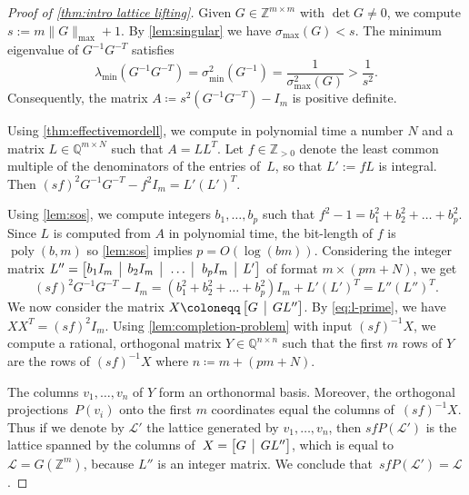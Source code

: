 \documentclass[a4paper,USenglish,cleveref,numberwithinsect]{lipics-v2021}
\DeclareMathOperator{\poly}{poly}
\newcommand{\QQ}{\mathbb{Q}}
\newcommand{\ZZ}{\mathbb{Z}}
\numberwithin{equation}{section}
\begin{document}
\begin{proof}[Proof of \cref{thm:intro lattice lifting}]
Given $G\in\ZZ^{m\times m}$ with $\det G\neq 0$, we compute
$s := m \|G\|_{\max} + 1 $.
By \cref{lem:singular} we have $\sigma_{\max}(G)< s$.
The minimum eigenvalue of $G^{-1}G^{-T}$ satisfies
\[
\lambda_{\min}(G^{-1}G^{-T}) = \sigma^2_{\min}(G^{-1}) = \frac{1}{\sigma^2_{\max}(G)} > \frac{1}{s^2}.
\]
Consequently, the matrix $A\coloneqq s^2 (G^{-1}G^{-T})-I_m$ is positive definite.

Using \cref{thm:effectivemordell}, we compute in polynomial time a number $N$
and a matrix $L\in\QQ^{m\times N}$ such that $A=LL^T$.
Let $f\in\ZZ_{>0}$ denote the least common multiple of the denominators of the entries of~$L$,
so that $L':=fL$ is integral. Then
$(sf)^2 G^{-1}G^{-T} - f^2 I_m= L'  (L')^T$.

Using \cref{lem:sos}, we compute integers $b_1,\ldots,b_p$ such that $f^2-1=b_1^2+b_2^2+\dots+b_p^2$.
Since $L$ is computed from $A$ in polynomial time, the bit-length of $f$ is $\poly(b,m)$ so \cref{lem:sos} implies $p=O(\log(bm))$.
Considering the integer matrix
$L'' = \begin{bmatrix}
		b_1 I_m \;\;\vline\;\; b_2 I_m \;\;\vline\;\; \dots  \;\;\vline\;\; b_p I_m  \;\;\vline\;\; L'
	\end{bmatrix}$
 of format $m\times (pm+N)$, we get
\begin{equation}\label{eq:l-prime}
 (sf)^2 G^{-1}G^{-T}  - I_m = (b_1^2+b_2^2+\dots+b_p^2)I_m+ L'  (L')^T = L'' (L'')^T.
\end{equation} %
We now consider the matrix $X\coloneqq \begin{bmatrix}
		G  \;\;\vline\;\; GL''
\end{bmatrix}$.
By \cref{eq:l-prime}, we have $XX^T = (sf)^2 I_m$.
Using \cref{lem:completion-problem} with input $(sf)^{-1} X$,
we compute a rational, orthogonal matrix $Y\in\QQ^{n\times n}$
such that the first $m$ rows of $Y$ are the rows of $(sf)^{-1} X$ where $n\coloneqq m+(pm+N)$.

The columns $v_1,\dots,v_n$ of $Y$ form an orthonormal basis. %
Moreover, the orthogonal projections~$P(v_i)$ onto the first $m$ coordinates
equal the columns of~$(sf)^{-1} X$.
Thus if we denote by $\mathcal{L}'$ the lattice generated by $v_1,\dots,v_n$, then $sf P(\mathcal{L}')$ is the lattice spanned by the columns of~$X = \begin{bmatrix}
    G  \;\;\vline\;\; GL''
\end{bmatrix}$, which is equal to $\mathcal L = G(\ZZ^m)$, because $L''$ is an integer matrix.
We conclude that~$sf P(\mathcal{L}')=\mathcal{L}$.
\end{proof}
\end{document}

